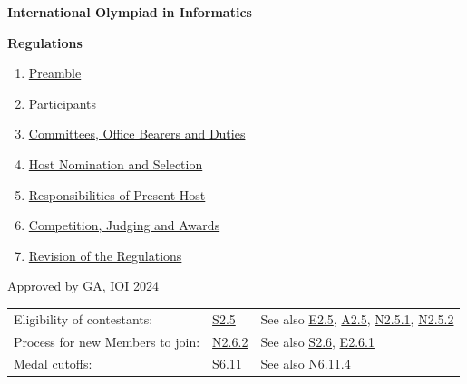 \documentclass[12pt,a4paper]{article}
\begin{document}
\newcommand{\Statute}[2]{\item[\textbf{S#1}]\label{S#1} #2}
\newcommand{\Explication}[2]{\item[\textbf{E#1}]\label{E#1} #2}
\newcommand{\Appendix}[2]{\item[\textbf{A#1}]\label{A#1} #2}
\newcommand{\Note}[2]{\item[\textbf{N#1}]\label{N#1} \emph{#2}}
\newcommand{\Separator}[1]{\item[]\noindent\rule[4pt]{\linewidth}{0.4pt}}
\newcommand{\IOIn}[1][]{IOI\emph{'$n{#1}$}}
\newcommand{\Link}[1]{\hyperref[#1]{#1}}

\centerline{\huge \textbf{International Olympiad in Informatics}}
\vspace{1em}
\centerline{\huge \textbf{Regulations}}
\vspace{2em}
\begin{enumerate}
\item \hyperref[sec:1]{Preamble}
\item \hyperref[sec:2]{Participants}
\item \hyperref[sec:3]{Committees, Office Bearers and Duties}
\item \hyperref[sec:4]{Host Nomination and Selection}
\item \hyperref[sec:5]{Responsibilities of Present Host}
\item \hyperref[sec:6]{Competition, Judging and Awards}
\item \hyperref[sec:7]{Revision of the Regulations}
\end{enumerate}
\vspace{2em}
Approved by GA, IOI 2024

\vspace*{\fill}
\par
\vspace{1em}
\begin{tabular}{ l l l }
    Eligibility of contestants: & \Link{S2.5} & See also \Link{E2.5}, \Link{A2.5}, \Link{N2.5.1}, \Link{N2.5.2} \\
    Process for new Members to join: & \Link{N2.6.2} & See also \Link{S2.6}, \Link{E2.6.1} \\
    Medal cutoffs: & \Link{S6.11} & See also \Link{N6.11.4} \\
\end{tabular}

\newpage
\end{document}
